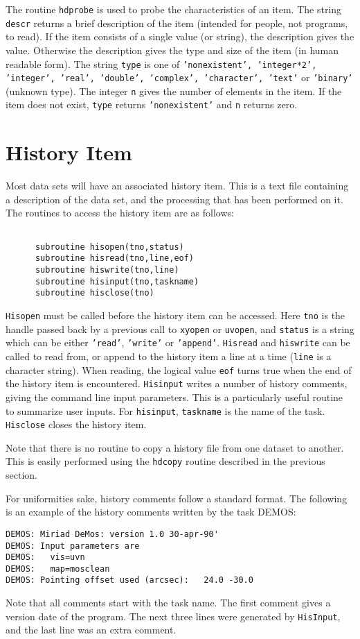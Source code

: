 The routine {\tt hdprobe} is used to probe the characteristics of an
item.  The string {\tt descr} returns a brief description of the item
(intended for people, not programs, to read). If the item consists of a 
single value (or string), the description gives the value. Otherwise
the description gives the type and size of the item (in human readable
form). The string {\tt type} is one of {\tt 'nonexistent',
'integer*2', 'integer', 'real', 'double', 'complex', 'character', 'text'}
or {\tt 'binary'} (unknown type). The integer {\tt n} gives the number
of elements in the item. If the item does not exist, {\tt type} returns
{\tt 'nonexistent'} and {\tt n} returns zero.

\section{History Item}
Most data sets will have an associated history item. This is a text file
containing a description of the data set, and the processing that has been
performed on it. The routines to access the history item are as follows:
\begin{verbatim}

      subroutine hisopen(tno,status)
      subroutine hisread(tno,line,eof)
      subroutine hiswrite(tno,line)
      subroutine hisinput(tno,taskname)
      subroutine hisclose(tno)

\end{verbatim}
{\tt Hisopen} must be called before the history item can be accessed. Here
{\tt tno} is the handle passed back by a previous call to {\tt xyopen}
or {\tt uvopen}, and {\tt status} is a string which can be either
{\tt 'read'}, {\tt 'write'} or {\tt 'append'}. {\tt Hisread} and {\tt hiswrite} can be
called to read from, or append to the history item a line at a time
({\tt line} is a character string). When reading, the
logical value {\tt eof} turns true when the end of the history item is
encountered. {\tt Hisinput} writes a number of history comments, giving
the command line input parameters. This is a particularly useful routine
to summarize user inputs. For {\tt hisinput}, {\tt taskname} is the name
of the task. {\tt Hisclose} closes the history item.

Note that there is no routine to copy a history file from one dataset to
another. This is easily performed using the {\tt hdcopy} routine described
in the previous section.

For uniformities sake, history comments follow a standard format. The
following is an example of the history comments written by the task
DEMOS:
\begin{verbatim}
DEMOS: Miriad DeMos: version 1.0 30-apr-90'
DEMOS: Input parameters are
DEMOS:   vis=uvn
DEMOS:   map=mosclean
DEMOS: Pointing offset used (arcsec):   24.0 -30.0
\end{verbatim}
Note that all comments start with the task name. The first comment gives a
version date of the program. The next
three lines were generated by {\tt HisInput}, and the last line was an
extra comment.

